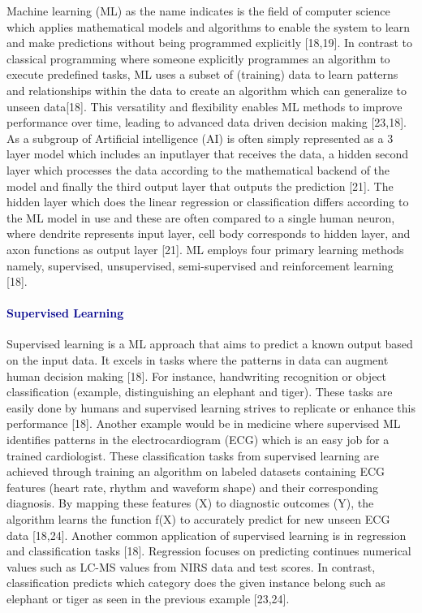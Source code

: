 \documentclass[12pt,a4paper]{report}
\begin{document}
Machine learning (ML) as the name indicates is the field of computer science which applies mathematical models and algorithms to enable the system to learn and make predictions without being programmed explicitly [18,19]. In contrast to classical programming where someone explicitly programmes an algorithm to execute predefined tasks,
ML uses a subset of (training) data to learn patterns and relationships within the data to create an algorithm which can generalize to unseen data[18]. This versatility and flexibility enables ML methods to improve performance over time, leading to advanced data driven decision making [23,18]. As a subgroup of Artificial intelligence (AI)
is often simply represented as a 3 layer model which includes an inputlayer that receives the data, a hidden second layer which processes the data according to the mathematical backend of the model and finally the third output layer that outputs the prediction [21]. The hidden layer which does the linear regression or classification differs 
according to the ML model in use and these are often compared to a single human neuron, where dendrite represents input layer, cell body corresponds to hidden layer, and axon functions as output layer [21]. ML employs four primary learning methods namely, supervised, unsupervised, semi-supervised and reinforcement learning [18]. \\

\paragraph{\textcolor{darkblue}{Supervised Learning}} 
Supervised learning is a ML approach that aims to predict a known output  based on the input data. It excels in tasks where the patterns in data can augment human decision making [18]. 
For instance, handwriting recognition or object classification (example, distinguishing an elephant and tiger). These tasks are easily done by humans and supervised learning strives to replicate 
or enhance this performance [18]. Another example would be in medicine where supervised ML identifies patterns in the electrocardiogram (ECG) which is an easy job for a trained cardiologist. 
These classification tasks from supervised learning are achieved through training an algorithm on labeled datasets containing ECG features (heart rate, rhythm and waveform shape) and their corresponding diagnosis. 
By mapping these features (X) to diagnostic outcomes (Y), the algorithm learns the function f(X) to accurately predict for new unseen ECG data [18,24]. Another common application of supervised learning is in regression and classification tasks [18]. 
Regression focuses on predicting continues numerical values such as LC-MS values from NIRS data and test scores. In contrast, classification predicts which category does the given instance belong such as elephant or tiger as seen in the previous example [23,24]. \\
\end{document}

